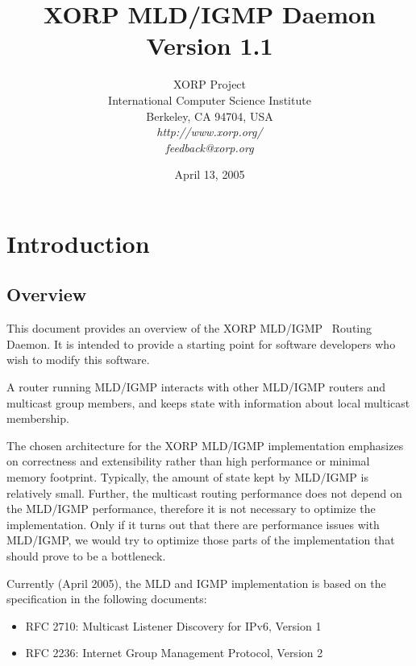 \documentclass[11pt]{article}
\begin{document}
\title{XORP MLD/IGMP Daemon \\
\vspace{1ex}
Version 1.1}
\author{ XORP Project					\\
	 International Computer Science Institute	\\
	 Berkeley, CA 94704, USA			\\
         {\it http://www.xorp.org/}			\\
	 {\it feedback@xorp.org}
}
\date{April 13, 2005}

\maketitle

\thispagestyle{empty}


\section{Introduction}


\subsection{Overview}

This document provides an overview of the XORP MLD/IGMP~\cite{MLD-V1,IGMP-V2}
Routing Daemon. It is intended to provide a starting point for software
developers who wish to modify this software.

A router running MLD/IGMP interacts with other MLD/IGMP routers and
multicast group members, and keeps state with information about local
multicast membership.

The chosen architecture for the XORP MLD/IGMP implementation emphasizes on
correctness and extensibility rather than high performance or minimal
memory footprint. Typically, the amount of state kept by MLD/IGMP is
relatively small. Further, the multicast routing performance does not
depend on the MLD/IGMP performance, therefore it is not necessary to
optimize the implementation. Only if it turns out that there are
performance issues with MLD/IGMP, we would try to optimize those parts of the
implementation that should prove to be a bottleneck.

Currently (April 2005), the MLD and IGMP implementation is based
on the specification in the following documents:

\begin{itemize}
  \item RFC 2710: Multicast Listener Discovery for IPv6, Version 1
  \item RFC 2236: Internet Group Management Protocol, Version 2
\end{itemize}
\end{document}
